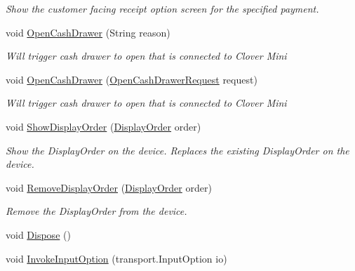 \begin{DoxyCompactItemize}
\begin{DoxyCompactList}\small\item\em Show the customer facing receipt option screen for the specified payment. \end{DoxyCompactList}\item 
void \hyperlink{interfacecom_1_1clover_1_1remotepay_1_1sdk_1_1_i_clover_connector_a0fc361c449dc63eab061ca6866124deb}{Open\+Cash\+Drawer} (String reason)
\begin{DoxyCompactList}\small\item\em Will trigger cash drawer to open that is connected to Clover Mini \end{DoxyCompactList}\item 
void \hyperlink{interfacecom_1_1clover_1_1remotepay_1_1sdk_1_1_i_clover_connector_a9e5e3aeeb855129b4c176c13c7c632c0}{Open\+Cash\+Drawer} (\hyperlink{classcom_1_1clover_1_1remotepay_1_1sdk_1_1_open_cash_drawer_request}{Open\+Cash\+Drawer\+Request} request)
\begin{DoxyCompactList}\small\item\em Will trigger cash drawer to open that is connected to Clover Mini \end{DoxyCompactList}\item 
void \hyperlink{interfacecom_1_1clover_1_1remotepay_1_1sdk_1_1_i_clover_connector_a50be4c513f6f67971b51f6f76f30ac06}{Show\+Display\+Order} (\hyperlink{classcom_1_1clover_1_1remote_1_1order_1_1_display_order}{Display\+Order} order)
\begin{DoxyCompactList}\small\item\em Show the Display\+Order on the device. Replaces the existing Display\+Order on the device. \end{DoxyCompactList}\item 
void \hyperlink{interfacecom_1_1clover_1_1remotepay_1_1sdk_1_1_i_clover_connector_a55ebe329c852bedccaeb882ca71c4774}{Remove\+Display\+Order} (\hyperlink{classcom_1_1clover_1_1remote_1_1order_1_1_display_order}{Display\+Order} order)
\begin{DoxyCompactList}\small\item\em Remove the Display\+Order from the device. \end{DoxyCompactList}\item 
void \hyperlink{interfacecom_1_1clover_1_1remotepay_1_1sdk_1_1_i_clover_connector_a105ca79ce329b1b7427450c323bc1d70}{Dispose} ()
\item 
void \hyperlink{interfacecom_1_1clover_1_1remotepay_1_1sdk_1_1_i_clover_connector_af4e56b0504d5e26d2953b5544bd8cf05}{Invoke\+Input\+Option} (transport.\+Input\+Option io)

\end{DoxyCompactItemize}
